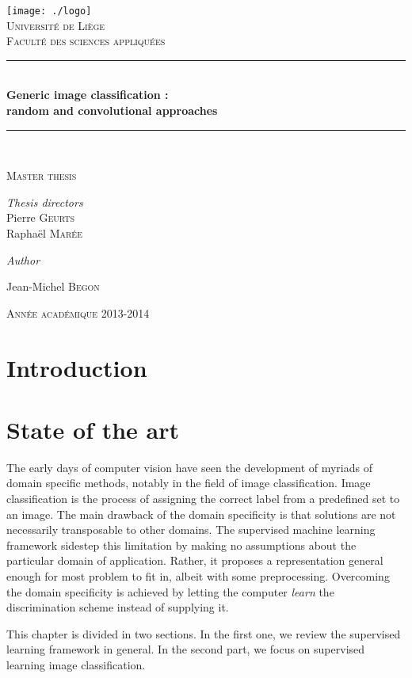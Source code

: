 \documentclass[a4paper]{report}
\newlength{\larg}
\newcommand{\titleg}{
  \begin{titlepage}
  \begin{center}

  \bigskip
  \bigskip
  \bigskip
  \bigskip 
  \bigskip


  \texttt{[image: ./logo]}\\[1cm]
  \smallskip
  \textsc{\LARGE Université de Liège}\\
  \smallskip
  \textsc{Faculté des sciences appliquées}\\

  \bigskip



  \rule{\columnwidth}{1pt} \\[0.4cm] 
  { \huge \bfseries Generic image classification : \\ \bigskip random and convolutional approaches}\\[0.4cm]
  \rule{\columnwidth}{1pt} \\[0.2cm]



  \begin{minipage}{0.7\textwidth} 
  \begin{center} \large 
  \textsc{Master thesis}
  \end{center} \end{minipage}

  \vfill


  \begin{minipage}{0.7\textwidth} \begin{center}
  \textit{Thesis directors} \\
  \large Pierre \textsc{Geurts} \\
  \large Raphaël \textsc{Marée} 
  \end{center} \end{minipage} 

  \bigskip
  \bigskip
  \bigskip

  \textit{Author} \\
  \begin{minipage}{0.7\textwidth} \begin{center}
  \large Jean-Michel \textsc{Begon}
  \end{center} \end{minipage} 
  


  \bigskip
  \bigskip
  \bigskip

  \textsc{Année académique 2013-2014}
  \end{center}
  \end{titlepage}
}
\begin{document}
\titleg
\thispagestyle{empty}
\newpage
{}

\pagestyle{fancy}
\lhead{}
\chead{}
\rhead{\itshape \textcolor{gris}{\rightmark}} %
\lfoot{\itshape \textcolor{gris}{Generic image classification - The RandConv framework}}
\cfoot{}
\rfoot{\itshape \textcolor{gris}{\thepage}}
\renewcommand{\headrulewidth}{0.4pt}
\renewcommand{\footrulewidth}{0.4pt}

\newpage 


\tableofcontents

\chapter{Introduction}

\chapter{State of the art}
The early days of computer vision have seen the development of myriads of domain specific methods, notably in the field of image classification. Image classification is the process of assigning the correct label from a predefined set to an image. The main drawback of the domain specificity is that solutions are not necessarily transposable to other domains. The supervised machine learning framework sidestep this limitation by making no assumptions about the particular domain of application. Rather, it proposes a representation general enough for most problem to fit in, albeit with some preprocessing. Overcoming the domain specificity is achieved by letting the computer \textit{learn} the discrimination scheme instead of supplying it.
\par
This chapter is divided in two sections. In the first one, we review the supervised learning framework in general. In the second part, we focus on supervised learning image classification.
\end{document}
